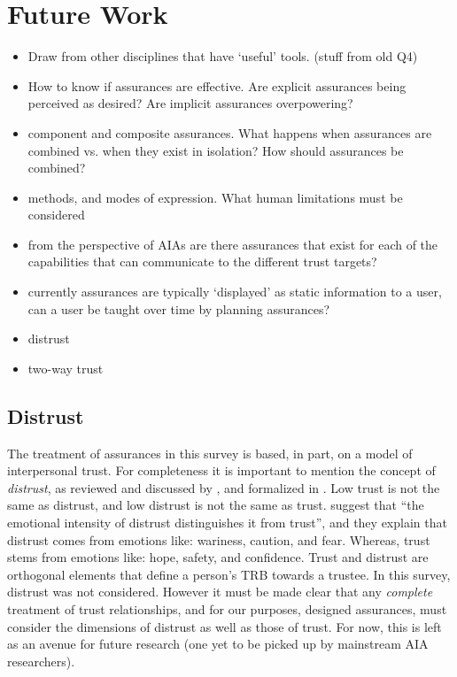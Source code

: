 \section{Future Work} \label{sec:future_work}

\begin{itemize}
    \item Draw from other disciplines that have `useful' tools. (stuff from old Q4)
    \item How to know if assurances are effective. Are explicit assurances being perceived as desired? Are implicit assurances overpowering?
    \item component and composite assurances. What happens when assurances are combined vs. when they exist in isolation? How should assurances be combined?
    \item methods, and modes of expression. What human limitations must be considered
    \item from the perspective of AIAs are there assurances that exist for each of the capabilities that can communicate to the different trust targets?
    \item currently assurances are typically `displayed' as static information to a user, can a user be taught over time by planning assurances?
    \item distrust
    \item two-way trust
\end{itemize}






\subsection{Distrust}
The treatment of assurances in this survey is based, in part, on a model of interpersonal trust. For completeness it is important to mention the concept of \textit{distrust}, as reviewed and discussed by \citet{Lewicki1998-ox}, and formalized in \citet{McKnight2001-gz}. Low trust is not the same as distrust, and low distrust is not the same as trust. \citet{McKnight2001-gz} suggest that ``the emotional intensity of distrust distinguishes it from trust'', and they explain that distrust comes from emotions like: wariness, caution, and fear. Whereas, trust stems from emotions like: hope, safety, and confidence. Trust and distrust are orthogonal elements that define a person's TRB towards a trustee. In this survey, distrust was not considered. However it must be made clear that any \emph{complete} treatment of trust relationships, and for our purposes, designed assurances, must consider the dimensions of distrust as well as those of trust. For now, this is left as an avenue for future research (one yet to be picked up by mainstream AIA researchers).



